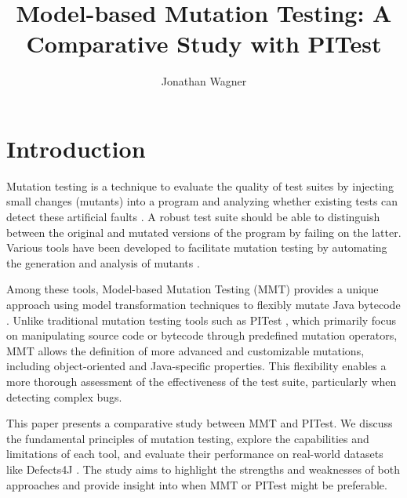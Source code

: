 \documentclass[sigplan, nonacm]{acmart}
\begin{document}
\title{Model-based Mutation Testing: A Comparative Study with PITest}

\author{Jonathan Wagner}

\maketitle

\section{Introduction}
Mutation testing is a technique to evaluate the quality of test suites by injecting small changes (mutants) into a program and analyzing whether existing tests can detect these artificial faults \cite{offutt_mutation_2001}. A robust test suite should be able to distinguish between the original and mutated versions of the program by failing on the latter. Various tools have been developed to facilitate mutation testing by automating the generation and analysis of mutants \cite{coles_pit_2016}.

Among these tools, Model-based Mutation Testing (MMT) provides a unique approach using model transformation techniques to flexibly mutate Java bytecode \cite{bockisch_mmt_2024, bockisch_mutation_2024}. Unlike traditional mutation testing tools such as PITest \cite{coles_pit_2016}, which primarily focus on manipulating source code or bytecode through predefined mutation operators, MMT allows the definition of more advanced and customizable mutations, including object-oriented and Java-specific properties. This flexibility enables a more thorough assessment of the effectiveness of the test suite, particularly when detecting complex bugs.

This paper presents a comparative study between MMT and PITest. We discuss the fundamental principles of mutation testing, explore the capabilities and limitations of each tool, and evaluate their performance on real-world datasets like Defects4J \cite{just_defects4j_2014}. The study aims to highlight the strengths and weaknesses of both approaches and provide insight into when MMT or PITest might be preferable.
\end{document}
